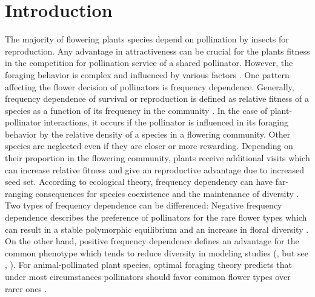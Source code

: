\section{Introduction}

The majority of flowering plants species depend on pollination by insects for reproduction. Any advantage in attractiveness can be crucial for the plants fitness in the competition for pollination service of a shared pollinator. However, the foraging behavior is complex and influenced by various factors \citep{goulson1999foraging}. One pattern affecting the flower decision of pollinators is frequency dependence. Generally, frequency dependence of survival or reproduction is defined as relative fitness of a species as a function of its frequency in the community \citep{ayala1974frequency,wright1946genetics}. In the case of plant-pollinator interactions, it occurs if the pollinator is influenced in its foraging behavior by the relative density of a species in a flowering community. Other species are neglected even if they are closer or more rewarding. Depending on their proportion in the flowering community, plants receive additional visits which can increase relative fitness and give an reproductive advantage due to increased seed set. According to ecological theory, frequency dependency can have far-ranging consequences for species coexistence and the maintenance of diversity \citep{levin1972low}. Two types of frequency dependence can be differenced: Negative frequency dependence describes the preference of pollinators for the rare flower types which can result in a stable polymorphic equilibrium and an increase in floral diversity \citep{gigord2001negative}. On the other hand, positive frequency dependence defines an advantage for the common phenotype which tends to reduce diversity in modeling studies (\citealt{may1974stability}, but see \citealt{bever1999dynamics}, \citealt{molofsky2002novel}). For animal-pollinated plant species, optimal foraging theory predicts that under most circumstances pollinators should favor common flower types over rarer ones \citep{kunin1996pollinator}.  \\

